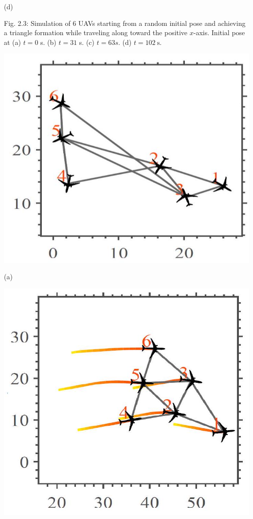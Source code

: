 \documentclass[10pt]{article}
\begin{document}
(d)

Fig. 2.3: Simulation of 6 UAVs starting from a random initial pose and achieving a triangle formation while traveling along toward the positive $x$-axis. Initial pose at (a) $t=0$ s. (b) $t=31$ s. (c) $t=63 s$. (d) $t=102 \mathrm{~s}$.

\begin{center}
\includegraphics[max width=\textwidth]{2023_10_07_53b70c7408bc8e139415g-39(3)}
\end{center}

(a)

\begin{center}
\includegraphics[max width=\textwidth]{2023_10_07_53b70c7408bc8e139415g-39(2)}
\end{center}
\end{document}
